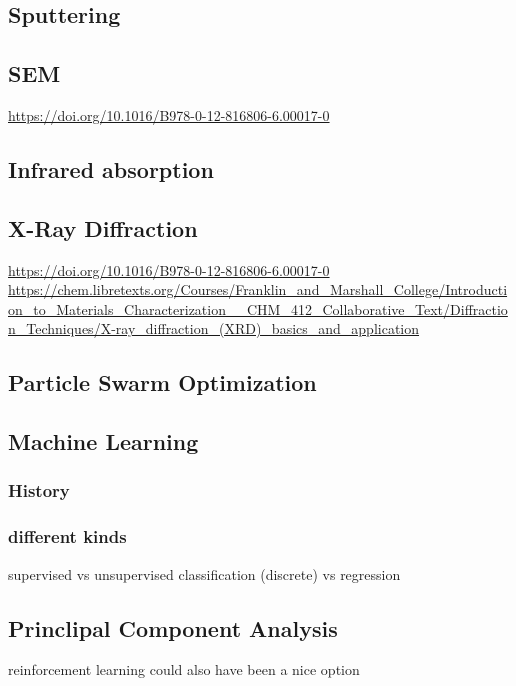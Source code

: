 \subsection{Sputtering}
\subsection{SEM}
\url{https://doi.org/10.1016/B978-0-12-816806-6.00017-0}\\
\subsection{Infrared absorption}
\subsection{X-Ray Diffraction}
\url{https://doi.org/10.1016/B978-0-12-816806-6.00017-0}\\
\url{https://chem.libretexts.org/Courses/Franklin_and_Marshall_College/Introduction_to_Materials_Characterization__CHM_412_Collaborative_Text/Diffraction_Techniques/X-ray_diffraction_(XRD)_basics_and_application}\\
\subsection{Particle Swarm Optimization}
\subsection{Machine Learning}
\subsubsection{History}
\subsubsection{different kinds} 
supervised vs unsupervised
classification (discrete) vs regression
\subsection{Princlipal Component Analysis}
reinforcement learning could also have been a nice option
